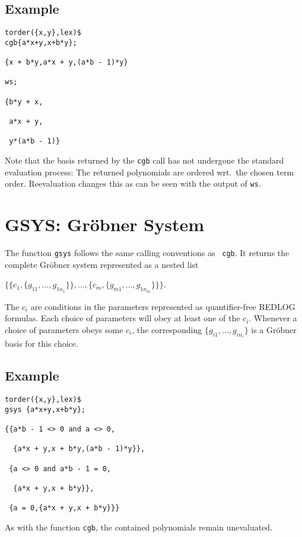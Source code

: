 \subsection*{Example}
\begin{verbatim}
torder({x,y},lex)$
cgb{a*x+y,x+b*y};

{x + b*y,a*x + y,(a*b - 1)*y}

ws;

{b*y + x,

 a*x + y,

 y*(a*b - 1)}
\end{verbatim}
Note that the basis returned by the {\tt cgb} call has not undergone
the standard evaluation process: The returned polynomials are ordered
wrt.~the chosen term order. Reevaluation changes this as can be seen
with the output of {\tt ws}.
%
\section{GSYS: Gr\"obner System}
The function {\tt gsys} follows the same calling conventions as {\tt
cgb}. It returns the complete Gr\"obner system represented as a nested
list
\begin{center}
\begin{tt}
$\bigl\{\bigl\{c_1,\{g_{11},\ldots,g_{1n_1}\}\bigr\},\dots,
\bigl\{c_m,\{g_{m1},\dots,g_{1n_m}\}\bigr\}\bigr\}$.
\end{tt}
\end{center}
The {\tt $c_i$} are conditions in the parameters represented as
quantifier-free REDLOG formulas. Each choice of parameters will obey
at least one of the {\tt $c_i$}. Whenever a choice of parameters obeys
some {\tt $c_i$}, the corresponding {\tt $\{g_{i1},\ldots,g_{in_i}\}$}
is a Gr\"obner basis for this choice.
%
\subsection*{Example}
\begin{verbatim}
torder({x,y},lex)$
gsys {a*x+y,x+b*y};

{{a*b - 1 <> 0 and a <> 0,

  {a*x + y,x + b*y,(a*b - 1)*y}},

 {a <> 0 and a*b - 1 = 0,

  {a*x + y,x + b*y}},

 {a = 0,{a*x + y,x + b*y}}}
\end{verbatim}
As with the function {\tt cgb}, the contained polynomials remain
unevaluated.

